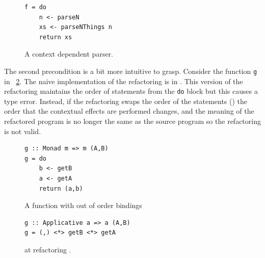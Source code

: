 \begin{figure}[t]
\begin{lstlisting}
f = do
	n <- parseN
	xs <- parseNThings n
	return xs
\end{lstlisting} 
\caption{A context dependent parser.}
\label{parseNThings}
\end{figure}

The second precondition is a bit more intuitive to grasp. Consider the function \texttt{g} in \DIFdelbegin {}\DIFdelend \DIFaddbegin {}\DIFaddend ~\ref{outOrd}. The naive implementation of the refactoring is in \DIFdelbegin {}\DIFdelend \DIFaddbegin {}\DIFaddend . This version of the refactoring maintains the order of statements from the \texttt{do} block but this causes a type error. Instead, if the refactoring swaps the order of the statements (\DIFdelbegin {}\DIFdelend \DIFaddbegin {}\DIFaddend ) the order that the contextual effects are performed changes, and the meaning of the refactored program is no longer the same as the source program so the refactoring is not valid. 

\begin{figure}[t]
\begin{lstlisting}
g :: Monad m => m (A,B)
g = do
	b <- getB
	a <- getA
	return (a,b)
\end{lstlisting}
\caption{A function with out of order bindings}
\label{outOrd}
\end{figure}

\begin{figure}[t]
\DIFdelbeginFL %

\DIFdelendFL \DIFaddbeginFL \begin{lstlisting}
g :: Applicative a => a (A,B)
g = (,) <*> getB <*> getA
\end{lstlisting}
\DIFaddendFL \caption{\DIFdelbeginFL {}\DIFdelendFL \DIFaddbeginFL {}\DIFaddendFL at refactoring \DIFdelbeginFL \texttt{}%
\DIFdelendFL \DIFaddbeginFL {}\DIFaddendFL .}
\DIFdelbeginFL %
\DIFdelendFL \DIFaddbeginFL \label{outOrd_ref1}
\DIFaddendFL \end{figure}

